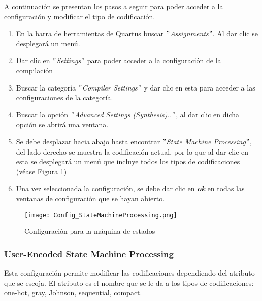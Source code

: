 \documentclass{article}
\begin{document}
A continuación se presentan los pasos a seguir para poder acceder a la configuración y modificar el tipo de codificación.
\begin{enumerate}
    \item En la barra de herramientas de Quartus buscar \textit{$"$Assignments$"$}. Al dar clic se desplegará un menú.
    \item Dar clic en \textit{$"$Settings$"$} para poder acceder a la configuración de la compilación
    \item Buscar la categoría \textit{$"$Compiler Settings$"$} y dar clic en esta para acceder a las configuraciones de la categoría.
    \item Buscar la opción \textit{$"$Advanced Settings (Synthesis)..$"$}, al dar clic en dicha opción se abrirá una ventana.
    \item Se debe desplazar hacia abajo hasta encontrar \textit{$"$State Machine Processing$"$}, del lado derecho se muestra la codificación actual, por lo que al dar clic en esta se desplegará un menú que incluye todos los tipos de codificaciones (véase Figura \ref{fig:Config_StateMachineProcessing})
    \item Una vez seleccionada la configuración, se debe dar clic en \textbf{\textit{ok}} en todas las ventanas de configuración que se hayan abierto.
\end{enumerate}
\begin{figure}[h!]
        \centering
        \texttt{[image: Config\_StateMachineProcessing.png]}
        \caption{\label{fig:Config_StateMachineProcessing}Configuración para la máquina de estados}
    \end{figure}
\subsubsection{User-Encoded State Machine Processing}
Esta configuración permite modificar las codificaciones dependiendo del atributo que se escoja. El atributo es el nombre que se le da a los tipos de codificaciones: one-hot, gray, Johnson, sequential, compact.
\end{document}
